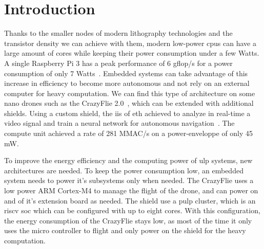 
\chapter{Introduction}

    Thanks to the smaller nodes of modern lithography technologies and the transistor density we can achieve with them, modern low-power \glspl{cpu} can have a large amount of cores while keeping their power consumption under a few Watts. A single Raspberry Pi 3 has a peak performance of 6 \si{gflop/s} for a power consumption of only 7 Watts~\cite{Art:RpiClusters}.
    Embedded systems can take advantage of this increase in efficiency to become more autonomous and not rely on an external computer for heavy computation. We can find this type of architecture on some nano drones such as the CrazyFlie 2.0~\cite{Web:CrazyFlie20}, which can be extended with additional shields. Using a custom shield, the \gls{iis} of \gls{eth} achieved to analyze in real-time a video signal and train a neural network for autonomous navigation~\cite{Art:NanoDrone}. The compute unit achieved a rate of 281 \si{MMAC/s} on a power-enveloppe of only 45 \si{mW}.

    To improve the energy efficiency and the computing power of \gls{ulp} systems, new architectures are needed. To keep the power consumption low, an embedded system needs to power it's subsystems only when needed. The CrazyFlie uses a low power ARM Cortex-M4 to manage the flight of the drone, and can power on and of it's extension board as needed. The shield use a \gls{pulp} cluster, which is an \gls{riscv} \gls{soc} which can be configured with up to eight cores. With this configuration, the energy consumption of the CrazyFlie stays low, as most of the time it only uses the micro controller to flight and only power on the shield for the heavy computation.

